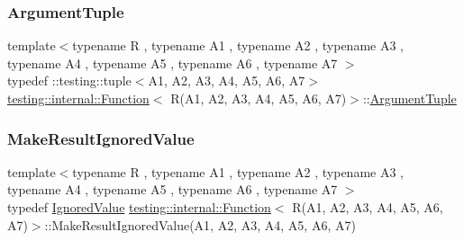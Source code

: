 \subsubsection{\texorpdfstring{Argument\+Tuple}{ArgumentTuple}}
{\footnotesize\ttfamily template$<$typename R , typename A1 , typename A2 , typename A3 , typename A4 , typename A5 , typename A6 , typename A7 $>$ \\
typedef \+::testing\+::tuple$<$A1, A2, A3, A4, A5, A6, A7$>$ \hyperlink{structtesting_1_1internal_1_1_function}{testing\+::internal\+::\+Function}$<$ R(A1, A2, A3, A4, A5, A6, A7)$>$\+::\hyperlink{structtesting_1_1internal_1_1_function_3_01_r_07_08_4_ad483c3128c470d8cdb55c3ac1c575c11}{Argument\+Tuple}}

\mbox{\label{structtesting_1_1internal_1_1_function_3_01_r_07_a1_00_01_a2_00_01_a3_00_01_a4_00_01_a5_00_01_a6_00_01_a7_08_4_a12b0ade73c76ea564afa7dd2b5c219b6}} 
\subsubsection{\texorpdfstring{Make\+Result\+Ignored\+Value}{MakeResultIgnoredValue}}
{\footnotesize\ttfamily template$<$typename R , typename A1 , typename A2 , typename A3 , typename A4 , typename A5 , typename A6 , typename A7 $>$ \\
typedef \hyperlink{classtesting_1_1internal_1_1_ignored_value}{Ignored\+Value} \hyperlink{structtesting_1_1internal_1_1_function}{testing\+::internal\+::\+Function}$<$ R(A1, A2, A3, A4, A5, A6, A7)$>$\+::Make\+Result\+Ignored\+Value(A1, A2, A3, A4, A5, A6, A7)}

\mbox{\label{structtesting_1_1internal_1_1_function_3_01_r_07_a1_00_01_a2_00_01_a3_00_01_a4_00_01_a5_00_01_a6_00_01_a7_08_4_a9e3d04c8472e00161b080690f62f9eb4}} 
